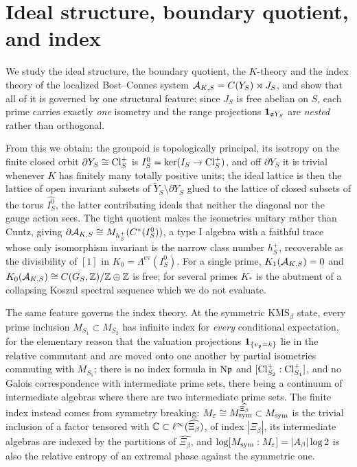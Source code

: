 \chapter[Ideals, boundary, and index]{Ideal structure, boundary quotient, and index}\label{ch:II}
\begin{summary}
We study the ideal structure, the boundary quotient, the $K$-theory and the index theory
of the localized Bost--Connes system $\mathcal{A}_{K,S}=C(Y_S)\rtimes J_S$, and show that all of it
is governed by one structural feature: since $J_S$ is free abelian on $S$, each prime
carries exactly \emph{one} isometry and the range projections
$\mathbf 1_{\mathfrak{a} Y_S}$ are \emph{nested} rather than orthogonal.

From this we obtain: the groupoid is topologically principal, its isotropy on the finite
closed orbit $\partial Y_S\cong\operatorname{Cl}^+_S$ is $I_S^0=\ker(I_S\to\operatorname{Cl}^+_S)$, and off
$\partial Y_S$ it is trivial whenever $K$ has finitely many totally positive units; the ideal
lattice is then the lattice of open invariant subsets of $\widetilde Y_S\setminus\partial Y_S$
glued to the lattice of closed subsets of the torus $\widehat{I_S^0}$, the latter
contributing ideals that neither the diagonal nor the gauge action sees. The tight quotient
makes the isometries unitary rather than Cuntz, giving
$\partial\mathcal{A}_{K,S}\cong M_{h^+_S}(C^*(I_S^0))$, a type $\mathrm I$ algebra with a faithful
trace whose only isomorphism invariant is the narrow class number $h^+_S$, recoverable as
the divisibility of $[1]$ in $K_0=\Lambda^{\mathrm{ev}}(I_S^0)$. For a single prime,
$K_1(\mathcal{A}_{K,S})=0$ and $K_0(\mathcal{A}_{K,S})\cong C(G_S,\mathbb{Z})/\mathbb{Z}\oplus\mathbb{Z}$ is free; for several primes
$K_*$ is the abutment of a collapsing Koszul spectral sequence which we do not evaluate.

The same feature governs the index theory. At the symmetric $\mathrm{KMS}_\beta$ state, every
prime inclusion $M_{S_1}\subset M_{S_2}$ has infinite index for \emph{every} conditional
expectation, for the elementary reason that the valuation projections $\mathbf 1_{\{v_{\mathfrak{p}}=k\}}$
lie in the relative commutant and are moved onto one another by partial isometries commuting
with $M_{S_1}$; there is no index formula in $\mathrm{N}\mathfrak{p}$ and $[\operatorname{Cl}^+_{S_2}:\operatorname{Cl}^+_{S_1}]$, and no
Galois correspondence with intermediate prime sets, there being a continuum of intermediate
algebras where there are two intermediate prime sets. The finite index instead comes from
symmetry breaking: $M_\varepsilon\cong M_{\mathrm{sym}}^{\widehat{\Xi_\beta}}\subset M_{\mathrm{sym}}$ is the trivial
inclusion of a factor tensored with $\mathbb{C}\subset\ell^\infty(\widehat{\Xi_\beta})$, of index
$|\Xi_\beta|$, its intermediate algebras are indexed by the partitions of
$\widehat{\Xi_\beta}$, and $\log[M_{\mathrm{sym}}:M_\varepsilon]=|A_\beta|\log2$ is also the relative
entropy of an extremal phase against the symmetric one.


\end{summary}
